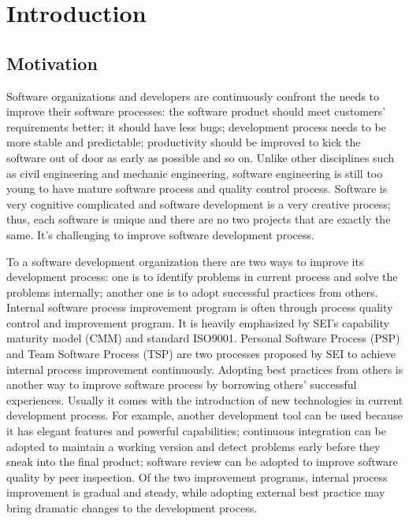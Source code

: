 \chapter{Introduction}
\label{chap:Intro}

\section{Motivation}
\label{sec:motivation}
Software organizations and developers are continuously confront the needs
to improve their software processes: the software product should meet
customers' requirements better; it should have less bugs; development
process needs to be more stable and predictable; productivity should be
improved to kick the software out of door as early as possible and so on.
Unlike other disciplines such as civil engineering and mechanic
engineering, software engineering is still too young to have mature
software process and quality control process. Software is very cognitive
complicated and software development is a very creative process; thus,
each software is unique and there are no two projects that are exactly the
same. It's challenging to improve software development process.

To a software development organization there are two ways to improve its
development process: one is to identify problems in current process and
solve the problems internally; another one is to adopt successful practices
from others. Internal software process improvement program is often through
process quality control and improvement program. It is heavily emphasized
by SEI's capability maturity model (CMM) and standard ISO9001. Personal
Software Process (PSP) and Team Software Process (TSP) are two processes
proposed by SEI to achieve internal process improvement continuously.
Adopting best practices from others is another way to improve software
process by borrowing others' successful experiences. Usually it comes with
the introduction of new technologies in current development process. For
example, another development tool can be used because it has elegant
features and powerful capabilities; continuous integration can be adopted
to maintain a working version and detect problems early before they sneak
into the final product; software review can be adopted to improve software
quality by peer inspection. Of the two improvement programs, internal
process improvement is gradual and steady, while adopting external best
practice may bring dramatic changes to the development process.

